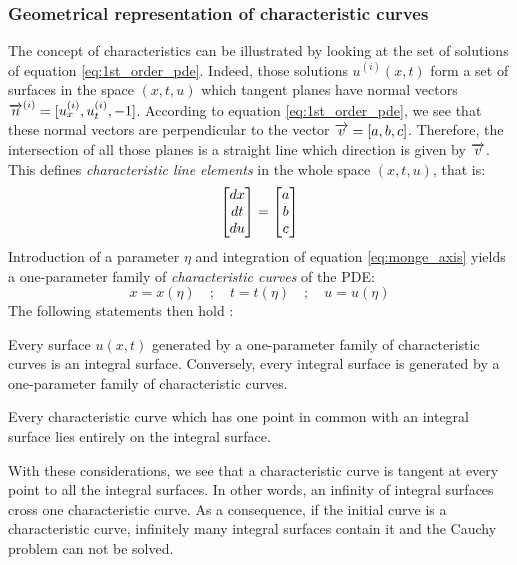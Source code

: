 \subsubsection*{Geometrical representation of characteristic curves}
The concept of characteristics can be illustrated by looking at the set of solutions of equation \eqref{eq:1st_order_pde}. Indeed, those solutions $u^{(i)}(x,t)$ form a set of surfaces in the space $(x,t,u)$ which tangent planes have normal vectors ${\overrightarrow{n}}^{(i)}=[u^{(i)}_x,u^{(i)}_t,-1]$. According to equation \eqref{eq:1st_order_pde}, we see that these normal vectors are perpendicular to the vector ${\overrightarrow{v}}=[a,b,c]$. Therefore, the intersection of all those planes is a straight line which direction is given by ${\overrightarrow{v}}$. This defines \textit{characteristic line elements} in the whole space $(x,t,u)$, that is:
\begin{equation}
  \label{eq:monge_axis}
  \left[\begin{matrix}dx \\ dt \\ du\end{matrix}\right] = \left[\begin{matrix}a \\ b \\c\end{matrix}\right]
\end{equation}
Introduction of a parameter $\eta$ and integration of equation \eqref{eq:monge_axis} yields a one-parameter family of \textit{characteristic curves} of the PDE:
\begin{equation*}
  x=x(\eta) \quad ; \quad t=t(\eta) \quad ; \quad u=u(\eta)
\end{equation*}
The following statements then hold \cite[Chapter~1]{Courant}:
\begin{theorem}
  \label{th:integral_surface_generated}
  Every surface $u(x,t)$ generated by a one-parameter family of characteristic curves is an integral surface. Conversely, every integral surface is generated by a one-parameter family of characteristic curves.
\end{theorem}
\begin{theorem}
  \label{th:charac_in_integral_surface}
  Every characteristic curve which has one point in common with an integral surface lies entirely on the integral surface.
\end{theorem}
With these considerations, we see that a characteristic curve is tangent at every point to all the integral surfaces. In other words, an infinity of integral surfaces cross one characteristic curve. As a consequence, if the initial curve is a characteristic curve, infinitely many integral surfaces contain it and the Cauchy problem can not be solved.

